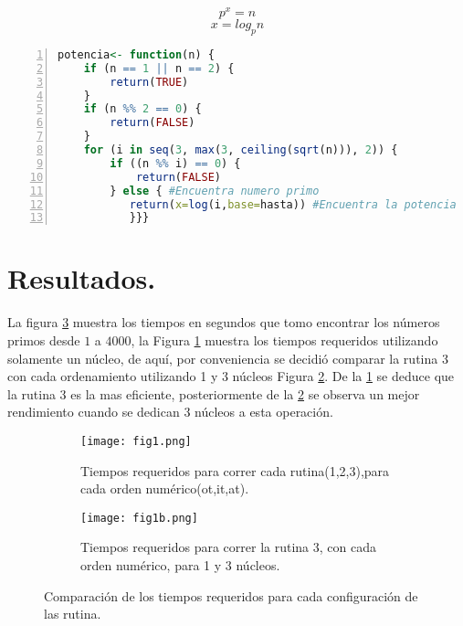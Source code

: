 \documentclass{article}
\begin{document}
\begin{equation}
    p^x=n
\end{equation}
\begin{equation}
    x=log_pn
\end{equation}
 \begin{lstlisting}[frame=single,numbers=left,language=R,caption=Función para encontrar el valor de la potencia $x$. \label{R2}]
potencia<- function(n) {
    if (n == 1 || n == 2) {
        return(TRUE)
    }
    if (n %% 2 == 0) {
        return(FALSE)
    }
    for (i in seq(3, max(3, ceiling(sqrt(n))), 2)) {
        if ((n %% i) == 0) {
            return(FALSE)
        } else { #Encuentra numero primo
           return(x=log(i,base=hasta)) #Encuentra la potencia
           }}}
\end{lstlisting} 
\section{Resultados.}
La figura \ref{F1} muestra los  tiempos en segundos que tomo encontrar los números primos desde $1$ a $4000$, la Figura \ref{fig1} muestra los tiempos requeridos utilizando solamente un núcleo, de aquí, por conveniencia se decidió comparar la rutina 3 con cada ordenamiento utilizando 1 y 3 núcleos Figura \ref{fig1b}. De la \ref{fig1} se deduce que la rutina 3 es la mas eficiente, posteriormente de la \ref{fig1b} se observa un mejor rendimiento cuando se dedican 3 núcleos a esta operación. 

\begin{figure}
     \centering
     \begin{subfigure}[b]{.8\textwidth}
         \centering
         \texttt{[image: fig1.png]}
         \caption{Tiempos requeridos para correr cada rutina(1,2,3),para cada orden numérico(ot,it,at).}
         \label{fig1}
     \end{subfigure}
     \hfill
     \begin{subfigure}[b]{.8\textwidth}
         \centering
         \texttt{[image: fig1b.png]}
         \caption{Tiempos requeridos para correr la rutina 3, con cada orden numérico, para 1 y 3 núcleos.}
         \label{fig1b}
     \end{subfigure}
     \caption{Comparación de los tiempos requeridos para cada configuración de las rutina.}
        \label{F1}
\end{figure}


\end{document}
